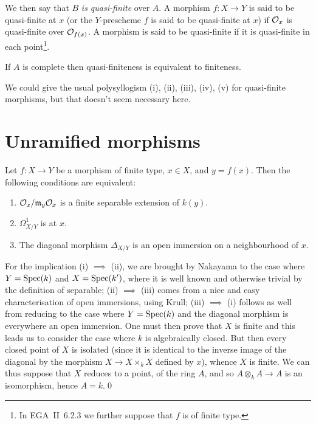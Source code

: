 \documentclass[../main.tex]{subfiles}
\begin{document}
We then say that $B$ \emph{is quasi-finite} over $A$.
A morphism $f\colon X\to Y$ is said to be quasi-finite at $x$ (or the $Y$-prescheme $f$ is said to be quasi-finite at $x$) if $\mathcal{O}_x$ is quasi-finite over $\mathcal{O}_{f(x)}$.
\completelyunsure
A morphism is said to be quasi-finite if it is quasi-finite in each point\footnote{In EGA~II~6.2.3 we further suppose that $f$ is of finite type.}.

\begin{cor}
    If $A$ is complete then quasi-finiteness is equivalent to finiteness.
\end{cor}

We could give the usual polysyllogism (i), (ii), (iii), (iv), (v) for quasi-finite morphisms, but that doesn't seem necessary here.


\section{Unramified morphisms}

\begin{prop}
    Let $f\colon X\to Y$ be a morphism of finite type, $x\in X$, and $y=f(x)$.
    Then the following conditions are equivalent:
    \begin{enumerate}[\normalfont(i)]
        \item $\mathcal{O}_x/\mathfrak{m}_y\mathcal{O}_x$ is a finite separable extension of $k(y)$.
        \item $\Omega_{X/Y}^1$ is  at $x$.
        \item The diagonal morphism $\Delta_{X/Y}$ is an open immersion on a neighbourhood of $x$.
    \end{enumerate}
\end{prop}

For the implication (i) $\implies$ (ii), we are brought by Nakayama to the case where $Y=\operatorname{Spec}(k)$ and $X=\operatorname{Spec}(k')$, where it is well known and otherwise trivial by the definition of separable; (ii) $\implies$ (iii) comes from a nice and easy characterisation of open immersions, using Krull; (iii) $\implies$ (i) follows as well from reducing to the case where $Y=\operatorname{Spec}(k)$ and the diagonal morphism is everywhere an open immersion.
One must then prove that $X$ is finite \completelyunsure and this leads us to consider the case where $k$ is algebraically closed.
But then every closed point of $X$ is isolated (since it is identical to the inverse image of the diagonal by the morphism $X\to X\times_k X$ defined by $x$), whence $X$ is finite.
We can thus suppose that $X$ reduces to a point, of the ring $A$, and so $A\otimes_k A\to A$ is an isomorphism, hence $A=k$.\qed
\end{document}
